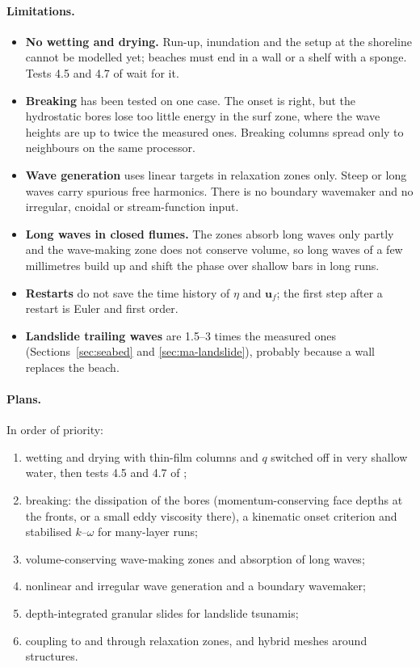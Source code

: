 \paragraph{Limitations.}
\begin{itemize}[nosep]
  \item \textbf{No wetting and drying.} Run-up, inundation and the setup at the
        shoreline cannot be modelled yet; beaches must end in a wall or a
        shelf with a sponge. Tests 4.5 and 4.7 of \citet{ma2012} wait for it.
  \item \textbf{Breaking} has been tested on one case. The onset is right, but
        the hydrostatic bores lose too little energy in the surf zone, where
        the wave heights are up to twice the measured ones. Breaking columns
        spread only to neighbours on the same processor.
  \item \textbf{Wave generation} uses linear targets in relaxation zones only.
        Steep or long waves carry spurious free harmonics. There is no
        boundary wavemaker and no irregular, cnoidal or stream-function input.
  \item \textbf{Long waves in closed flumes.} The zones absorb long waves only
        partly and the wave-making zone does not conserve volume, so long waves
        of a few millimetres build up and shift the phase over shallow bars in
        long runs.
  \item \textbf{Restarts} do not save the time history of $\eta$ and
        $\bm{u}_f$; the first step after a restart is Euler and first order.
  \item \textbf{Landslide trailing waves} are 1.5--3 times the measured ones
        (Sections~\ref{sec:seabed} and \ref{sec:ma-landslide}), probably
        because a wall replaces the beach.
\end{itemize}

\paragraph{Plans.} In order of priority:
\begin{enumerate}[nosep]
  \item wetting and drying with thin-film columns and $q$ switched off in very
        shallow water, then tests 4.5 and 4.7 of \citet{ma2012};
  \item breaking: the dissipation of the bores (momentum-conserving face depths
        at the fronts, or a small eddy viscosity there), a kinematic onset
        criterion and stabilised $k$--$\omega$ \citep{larsen2018} for
        many-layer runs;
  \item volume-conserving wave-making zones and absorption of long waves;
  \item nonlinear and irregular wave generation and a boundary wavemaker;
  \item depth-integrated granular slides for landslide tsunamis;
  \item coupling to  and  through relaxation
        zones, and hybrid meshes around structures.
\end{enumerate}
